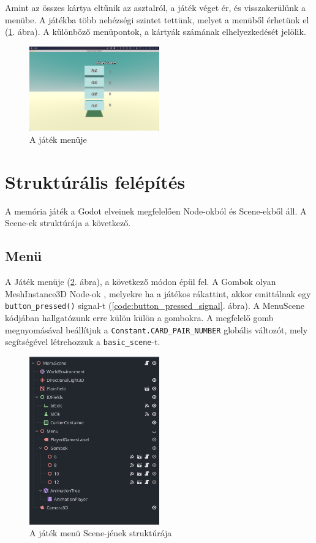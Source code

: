Amint az összes kártya eltűnik az asztalról, a játék véget ér, és visszakerülünk a menübe.
A játékba több nehézségi szintet tettünk, melyet a menüből érhetünk el (\ref{img:menu}. ábra). A különböző menüpontok, a kártyák számának elhelyezkedését jelölik.
\begin{figure}[h]
    \centering
    \includegraphics[width=0.5\textwidth]{img/menu.png}
    \caption{A játék menüje}
    \label{img:menu}  
\end{figure}

\section{Struktúrális felépítés}
A memória játék a Godot elveinek megfelelően Node-okból és Scene-ekből \cite{godotengineNodesScenes} áll. A Scene-ek struktúrája a következő.
\subsection{Menü}


A Játék menüje (\ref{img:menu_scene}. ábra), a következő módon épül fel. A Gombok olyan MeshInstance3D Node-ok \cite{godotengineMeshInstance3D}, melyekre ha a játékos rákattint, akkor emittálnak egy \lstinline{button_pressed()} signal-t (\ref{code:button_pressed_signal}. ábra).
A MenuScene kódjában hallgatózunk erre külön külön a gombokra. A megfelelő gomb megnyomásával beállítjuk a \lstinline{Constant.CARD_PAIR_NUMBER} globális változót, mely segítségével létrehozzuk a \lstinline{basic_scene}-t.
\begin{figure}[h]
    \centering
    \includegraphics[width=0.5\textwidth]{img/menu_scene_tree.png}
    \caption{A játék menü Scene-jének struktúrája}
    \label{img:menu_scene}  
\end{figure}

